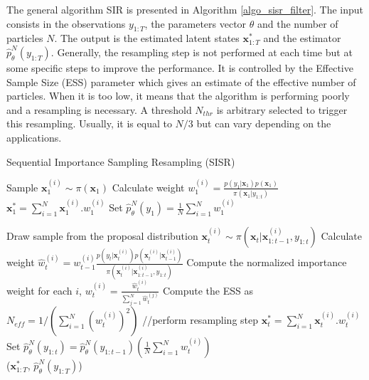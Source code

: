 \documentclass[11pt,a4,twosided,singlespacing,titlepagenumber=on]{scrreprt}
\numberwithin{equation}{chapter} %
\theoremstyle{remark}
\newcommand{\matr}[1]{\mathbf{#1}}
\begin{document}
The general algorithm SIR is presented in Algorithm \ref{algo_sisr_filter}. The input consists in the observations $y_{1:T}$, the parameters vector $\theta$ and the number of particles $N$. The output is the estimated latent states $\matr{x}^*_{1:T}$ and the estimator $\hat{p}^N_\theta(y_{1:T})$. Generally, the resampling step is not performed at each time but at some specific steps to improve the performance. It is controlled by the Effective Sample Size (ESS) parameter which gives an estimate of the effective number of particles. When it is too low, it means that the algorithm is performing poorly and a resampling is necessary. A threshold $N_{thr}$ is arbitrary selected to trigger this resampling. Usually, it is equal to $N/3$ but can vary depending on the applications.

\begin{algorithm}[H]
\caption{Sequential Importance Sampling Resampling (SISR)}\label{algo_sisr_filter}
{\small
\begin{algorithmic}[1]
	\State Sample $\matr{x}_1^{(i)} \sim \pi (\matr{x}_1)$
	\State Calculate weight $w_1^{(i)} = \displaystyle{\frac{p(y_1 | \matr{x}_1) p(\matr{x}_1)}{\pi (\matr{x}_1 | y_{1:t})}}$
\State $\matr{x}^*_1 = \sum_{i=1}^N \matr{x}_1^{(i)}.w_1^{(i)}$
\State Set $\hat{p}^N_\theta(y_1) = \frac{1}{N} \sum_{i=1}^N w_1^{(i)}$

	  \State Draw sample from the proposal distribution $\matr{x}_t^{(i)} \sim \pi \left(\matr{x}_t|\matr{x}_{1:t-1}^{(i)}, y_{1:t} \right)$
		\State Calculate weight $\displaystyle{\hat{w}_t^{(i)} = w_{t-1}^{(i)} \frac{p(y_t|\matr{x}_t^{(i)}) p(\matr{x}_t^{(i)}|\matr{x}_{t-1}^{(i)})}{\pi \left(\matr{x}_t^{(i)}|\matr{x}_{1:t-1}^{(i)}, y_{1:t} \right)}}$
	\State Compute the normalized importance weight for each $i$, $\displaystyle{w_t^{(i)} = \frac{\hat{w}_t^{(i)}}{\sum_{j=1}^N \hat{w}_t^{(j)}}}$
	\State Compute the ESS as $N_{eff} = 1 / \left(  \sum_{i=1}^N \left(w_t^{(i)} \right)^2 \right)$
		  \State //perform resampling step
	\State $\matr{x}^*_t = \sum_{i=1}^N \matr{x}_t^{(i)}.w_t^{(i)}$
	\State Set $\hat{p}^N_\theta(y_{1:t}) = \hat{p}^N_\theta(y_{1:t-1}) \left(\frac{1}{N} \sum_{i=1}^N w_t^{(i)} \right)$
\\
\Return ($\matr{x}^*_{1:T}$, $\hat{p}^N_\theta(y_{1:T})$)
\EndProcedure
\end{algorithmic}
}
\end{algorithm}
\end{document}
